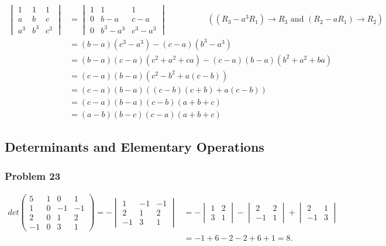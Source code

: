 \documentclass[a4paper,12pt]{article}
\begin{document}
\begin{align*}
    \begin{vmatrix}
        1&1&1\\
        a&b&c\\
        a^3&b^3&c^3
    \end{vmatrix} &= \begin{vmatrix}
        1&1&1\\
        0&b-a&c-a\\
        0&b^3-a^3&c^3-a^3
    \end{vmatrix} \quad \quad \quad \quad \quad ((R_3-a^3R_1)\to R_3\text{ and } (R_2-aR_1)\to R_2)
    \\ &= (b-a)(c^3-a^3)-(c-a)(b^3-a^3)\\&=(b-a)(c-a)(c^2+a^2+ca)-(c-a)(b-a)(b^2+a^2+ba)
    \\ &= (c-a)(b-a)(c^2-b^2+a(c-b))
    \\ &= (c-a)(b-a)((c-b)(c+b)+a(c-b))
    \\ &= (c-a)(b-a)(c-b)(a+b+c)
    \\ &= (a-b)(b-c)(c-a)(a+b+c)
\end{align*}


\subsection{Determinants and Elementary Operations}
\subsubsection*{Problem 23}
\begin{align*} det\begin{pmatrix}
    5&1&0&1\\
    1&0&-1&-1\\
    2&0&1&2\\
    -1&0&3&1
\end{pmatrix} =
    -\begin{vmatrix}
        1&-1&-1\\
        2&1&2\\
        -1&3&1
    \end{vmatrix} &= -\begin{vmatrix}
        1&2\\
        3&1
    \end{vmatrix} - \begin{vmatrix}
        2&2\\
        -1&1
    \end{vmatrix} + \begin{vmatrix}
        2&1\\
        -1&3
    \end{vmatrix}\\ &= -1+6-2-2+6+1=8.
\end{align*}
\end{document}
